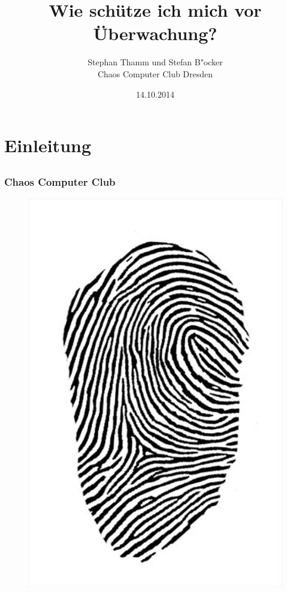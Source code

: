 \documentclass[12pt]{beamer}
\title{Wie schütze ich mich vor Überwachung?}
\author{\small Stephan Thamm und Stefan B"ocker\\\large Chaos Computer Club Dresden}
\date{14.10.2014}
\begin{document}
\maketitle

\section{Einleitung}
\subsection{}

\begin{frame}
  \frametitle{Chaos Computer Club}
  \begin{figure}
    \includegraphics[height=0.7\textheight]{img/fingerabdruck.jpg}
  \end{figure}
\end{frame}
\end{document}
